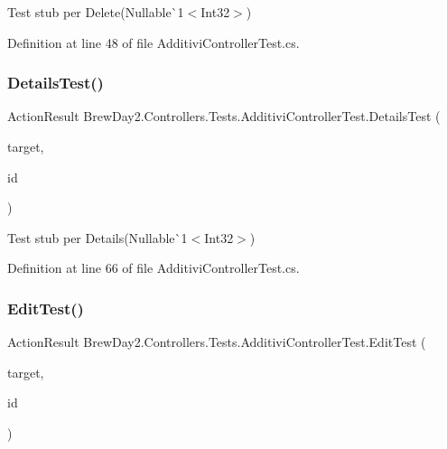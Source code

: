 Test stub per Delete(Nullable\`{}1$<$Int32$>$)



Definition at line 48 of file Additivi\+Controller\+Test.\+cs.

\mbox{\label{class_brew_day2_1_1_controllers_1_1_tests_1_1_additivi_controller_test_addb919cd3fdd282c5e7b8fd899318ae1}} 
\subsubsection{\texorpdfstring{Details\+Test()}{DetailsTest()}}
{\footnotesize\ttfamily Action\+Result Brew\+Day2.\+Controllers.\+Tests.\+Additivi\+Controller\+Test.\+Details\+Test (\begin{DoxyParamCaption}\item[{\mbox{[}\+Pex\+Assume\+Under\+Test\mbox{]} \mbox{\hyperlink{class_brew_day2_1_1_controllers_1_1_additivi_controller}{Additivi\+Controller}}}]{target,  }\item[{int?}]{id }\end{DoxyParamCaption})}



Test stub per Details(Nullable\`{}1$<$Int32$>$)



Definition at line 66 of file Additivi\+Controller\+Test.\+cs.

\mbox{\label{class_brew_day2_1_1_controllers_1_1_tests_1_1_additivi_controller_test_a29fb36e7b98ba86f82b0a73cb2982ca3}} 
\subsubsection{\texorpdfstring{Edit\+Test()}{EditTest()}}
{\footnotesize\ttfamily Action\+Result Brew\+Day2.\+Controllers.\+Tests.\+Additivi\+Controller\+Test.\+Edit\+Test (\begin{DoxyParamCaption}\item[{\mbox{[}\+Pex\+Assume\+Under\+Test\mbox{]} \mbox{\hyperlink{class_brew_day2_1_1_controllers_1_1_additivi_controller}{Additivi\+Controller}}}]{target,  }\item[{int?}]{id }\end{DoxyParamCaption})}



